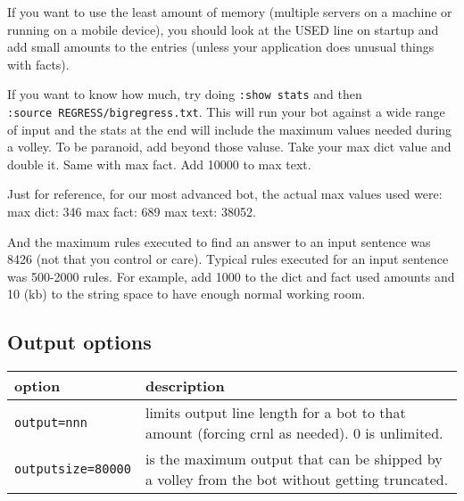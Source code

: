 \documentclass[]{article}
\begin{document}
If you want to use the least amount of memory (multiple servers on a
machine or running on a mobile device), you should look at the USED line
on startup and add small amounts to the entries (unless your application
does unusual things with facts).

If you want to know how much, try doing \texttt{:show\ stats} and then
\texttt{:source\ REGRESS/bigregress.txt}. This will run your bot against
a wide range of input and the stats at the end will include the maximum
values needed during a volley. To be paranoid, add beyond those valuse.
Take your max dict value and double it. Same with max fact. Add 10000 to
max text.

Just for reference, for our most advanced bot, the actual max values
used were: max dict: 346 max fact: 689 max text: 38052.

And the maximum rules executed to find an answer to an input sentence
was 8426 (not that you control or care). Typical rules executed for an
input sentence was 500-2000 rules. For example, add 1000 to the dict and
fact used amounts and 10 (kb) to the string space to have enough normal
working room.

\subsection{Output options}\label{output-options}

\begin{longtable}[]{@{}ll@{}}
\toprule
\begin{minipage}[b]{0.20\columnwidth}\raggedright\strut
option\strut
\end{minipage} & \begin{minipage}[b]{0.74\columnwidth}\raggedright\strut
description\strut
\end{minipage}\tabularnewline
\midrule
\endhead
\begin{minipage}[t]{0.20\columnwidth}\raggedright\strut
\texttt{output=nnn}\strut
\end{minipage} & \begin{minipage}[t]{0.74\columnwidth}\raggedright\strut
limits output line length for a bot to that amount (forcing crnl as
needed). 0 is unlimited.\strut
\end{minipage}\tabularnewline
\begin{minipage}[t]{0.20\columnwidth}\raggedright\strut
\texttt{outputsize=80000}\strut
\end{minipage} & \begin{minipage}[t]{0.74\columnwidth}\raggedright\strut
is the maximum output that can be shipped by a volley from the bot
without getting truncated.\strut
\end{minipage}\tabularnewline
\bottomrule
\end{longtable}
\end{document}
